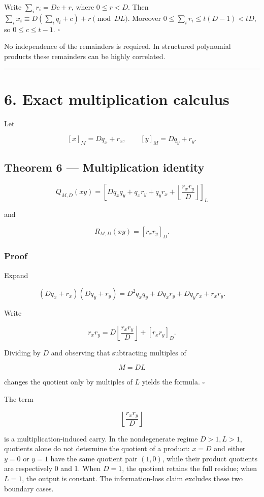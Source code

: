 \documentclass[11pt,a4paper]{article}
\begin{document}
Write \(\sum_i r_i=Dc+r\), where \(0\le r<D\). Then \(\sum_i x_i\equiv D(\sum_iq_i+c)+r\pmod{DL}\). Moreover \(0\le\sum_i r_i\le t(D-1)<tD\), so \(0\le c\le t-1\). \(\square\)

No independence of the remainders is required. In structured polynomial products these remainders can be highly correlated.

\begin{center}\rule{0.5\linewidth}{0.5pt}\end{center}

\section{6. Exact multiplication calculus}\label{exact-multiplication-calculus}

Let

\[
[x]_M=Dq_x+r_x,\qquad
[y]_M=Dq_y+r_y.
\]

\subsection{Theorem 6 --- Multiplication identity}\label{theorem-6-multiplication-identity}

\[
\boxed{
Q_{M,D}(xy)
=
\left[
Dq_xq_y
+q_xr_y
+q_yr_x
+\left\lfloor\frac{r_xr_y}{D}\right\rfloor
\right]_L
}
\]

and

\[
\boxed{
R_{M,D}(xy)
=
[r_xr_y]_D.
}
\]

\subsubsection{Proof}\label{proof-5}

Expand

\[
(Dq_x+r_x)(Dq_y+r_y)
=
D^2q_xq_y
+Dq_xr_y
+Dq_yr_x
+r_xr_y.
\]

Write

\[
r_xr_y
=
D\left\lfloor\frac{r_xr_y}{D}\right\rfloor
+[r_xr_y]_D.
\]

Dividing by \(D\) and observing that subtracting multiples of

\[
M=DL
\]

changes the quotient only by multiples of \(L\) yields the formula. \(\square\)

The term

\[
\left\lfloor\frac{r_xr_y}{D}\right\rfloor
\]

is a multiplication-induced carry. In the nondegenerate regime \(D>1,L>1\), quotients alone do not determine the quotient of a product: \(x=D\) and either \(y=0\) or \(y=1\) have the same quotient pair \((1,0)\), while their product quotients are respectively 0 and 1. When \(D=1\), the quotient retains the full residue; when \(L=1\), the output is constant. The information-loss claim excludes these two boundary cases.
\end{document}
